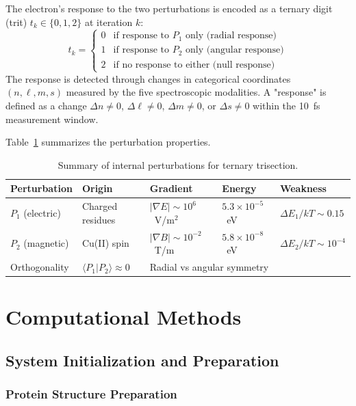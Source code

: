 \documentclass[twocolumn,10pt]{article}
\begin{document}
The electron's response to the two perturbations is encoded as a ternary digit 
(trit) $t_k \in \{0, 1, 2\}$ at iteration $k$:
%
\begin{equation}
t_k = \begin{cases}
0 & \text{if response to } P_1 \text{ only (radial response)} \\
1 & \text{if response to } P_2 \text{ only (angular response)} \\
2 & \text{if no response to either (null response)}
\end{cases}
\label{eq:trit_encoding}
\end{equation}
%
The response is detected through changes in categorical coordinates $(n, \ell, m, s)$ 
measured by the five spectroscopic modalities. A "response" is defined as a 
change $\Delta n \neq 0$, $\Delta \ell \neq 0$, $\Delta m \neq 0$, or $\Delta s \neq 0$ 
within the 10~fs measurement window.

Table~\ref{tab:perturbation_summary} summarizes the perturbation properties.

\begin{table}[h]
\centering
\caption{Summary of internal perturbations for ternary trisection.}
\label{tab:perturbation_summary}
\begin{tabular}{@{}lllll@{}}
\toprule
Perturbation & Origin & Gradient & Energy & Weakness \\
\midrule
$P_1$ (electric) & Charged residues & $|\nabla E| \sim 10^6$~V/m$^2$ & $5.3 \times 10^{-5}$~eV & $\Delta E_1/kT \sim 0.15$ \\
$P_2$ (magnetic) & Cu(II) spin & $|\nabla B| \sim 10^{-2}$~T/m & $5.8 \times 10^{-8}$~eV & $\Delta E_2/kT \sim 10^{-4}$ \\
\midrule
Orthogonality & $\langle P_1 | P_2 \rangle \approx 0$ & \multicolumn{3}{l}{Radial vs angular symmetry} \\
\bottomrule
\end{tabular}
\end{table}

\section{Computational Methods}

\subsection{System Initialization and Preparation}

\subsubsection{Protein Structure Preparation}
\end{document}
